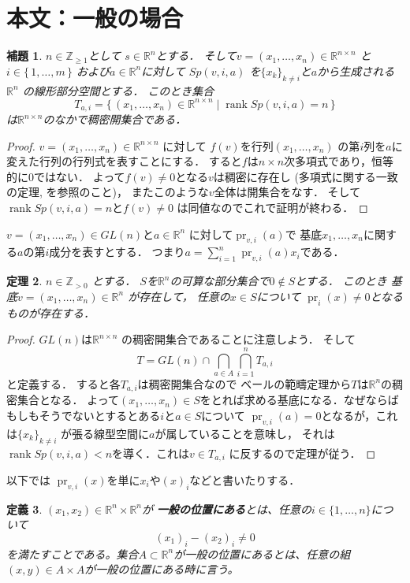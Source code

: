 \documentclass[leqno, a4paper, 12pt]{jsarticle}
\newtheorem{thm}{定理}
\newtheorem{lem}[thm]{補題}
\newtheorem{df}[thm]{定義}
\newcommand{\zz}{\mathbb{Z}}
\newcommand{\rr}{\mathbb{R}}
\DeclareMathOperator{\pr}{pr}
\DeclareMathOperator{\rank}{rank}
\begin{document}
\section{本文：一般の場合}
\begin{lem}
$n\in \zz_{\ge 1}$として
$s\in \rr^{n}$とする．
そして$v=(x_{1}, \dots, x_{n})\in \rr^{n\times n}$
と$i\in \{\, 
1, \dots, m
\, \}$
および$a\in \rr^{n}$に対して
$Sp(v, i, a)$
を$\{x_{k}\}_{k\neq i}$と$a$から生成される$\rr^{n}$
の線形部分空間とする．
このとき集合
\[
T_{a, i}=
\{\, (x_1, \dots, x_n)\in \rr^{n\times n}\mid
\rank Sp(v, i, a)=n
\, \}
\]
は$\rr^{n\times n}$のなかで稠密開集合である．
\end{lem}
\begin{proof}
$v=(x_{1}, \dots, x_{n})\in \rr^{n\times n}$
に対して
$f(v)$を行列$(x_{1}, \dots, x_{n})$
の第$i$列を$a$に変えた行列の行列式を表すことにする．
すると$f$は$n\times n$次多項式であり，恒等的に$0$ではない．
よって$f(v)\neq 0$となる$v$は稠密に存在し
(多項式に関する一致の定理, \cite{denden}を参照のこと)，
またこのような$v$全体は開集合をなす．
そして$\rank Sp(v, i, a)=n$と$f(v)\neq 0$
は同値なのでこれで証明が終わる．
\end{proof}

$v=(x_{1}, \dots, x_{n})\in GL(n)$と$a\in \rr^{n}$
に対して$\pr_{v, i}(a)$で
基底$x_{1}, \dots, x_{n}$に関する$a$の第$i$成分を表すとする．
つまり$a=\sum_{i=1}^{n}\pr_{v, i}(a)x_{i}$である．

\begin{thm}\label{thm:bairebaire}
$n\in \zz_{>0}$
とする．
$S$を$\rr^n$の可算な部分集合で$0\not\in S$とする．
このとき
基底$v=(x_1, \dots, x_n )\in \rr^n$
が存在して，
任意の$x\in S$について
$\pr_i(x)\neq 0$となるものが存在する．
\end{thm}
\begin{proof}
$GL(n)$は$\rr^{n\times n}$
の稠密開集合であることに注意しよう．
そして
\[
T=GL(n)\cap \bigcap_{a\in A}\bigcap_{i=1}^{n}T_{a, i}
\]
と定義する．
すると各$T_{a, i}$は稠密開集合なので
ベールの範疇定理から$T$は$\rr^{n}$の稠密集合となる．
よって$(x_{1}, \dots, x_{n})\in S$をとれば求める基底になる．なぜならばもしもそうでないとするとある$i$と$a\in S$について
$\pr_{v, i}(a)=0$となるが，これは$\{x_{k}\}_{k\neq i}$
が張る線型空間に$a$が属していることを意味し，
それは$\rank Sp(v, i, a)<n$を導く．これは$v\in T_{a, i}$
に反するので定理が従う．
\end{proof}


以下では
$\pr_{v, i}(x)$を単に$x_{i}$や$(x)_{i}$などと書いたりする．
\begin{df}
$(x_1,x_2)\in  \rr^n\times \rr^n$が
\textbf{一般の位置にある}とは、任意の$i\in \{1,\dots, 
n\}$について
\[
(x_1)_i-(x_2)_i\neq0
\]
を満たすことである。集合$A \subset \rr^n$が一般の位置にあるとは、任意の組$(x,y)\in A\times A$が一般の位置にある時に言う。
\end{df}
\end{document}
